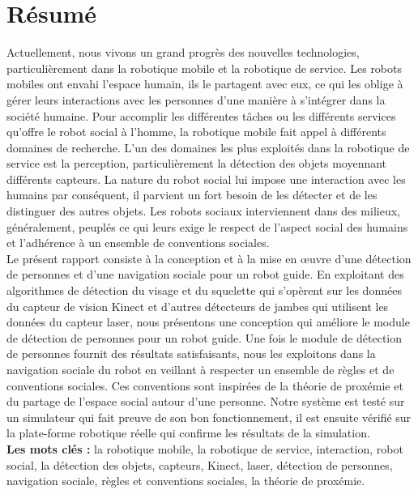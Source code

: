 \chapter*{Résumé}%
\label{Chapter2} %

\tab Actuellement, nous vivons un grand progrès des nouvelles technologies, particulièrement dans la robotique mobile et la robotique de service. Les robots mobiles ont envahi l'espace humain, ils le partagent avec eux, ce qui les oblige à gérer leurs interactions avec les personnes d'une manière à s'intégrer dans la société humaine. Pour accomplir les différentes tâches ou les différents services qu'offre le robot social à l'homme, la robotique mobile fait appel à différents domaines de recherche. L'un des domaines les plus exploités dans la robotique de service est la perception, particulièrement la détection des objets moyennant différents capteurs. La nature du robot social lui impose une interaction avec les humains par conséquent, il parvient un fort besoin de les détecter et de les distinguer des autres objets. Les robots sociaux interviennent dans des milieux, généralement, peuplés ce qui leurs exige le respect de l'aspect social des humains et l'adhérence à un ensemble de conventions sociales.\vspace{5px}\\
\tab Le présent rapport consiste à la conception et à la mise en œuvre d'une détection de personnes et d'une navigation sociale pour un robot guide. En exploitant des algorithmes de détection du visage et du squelette qui s'opèrent sur les données du capteur de vision Kinect et d'autres détecteurs de jambes qui utilisent les données du capteur laser, nous présentons une conception qui améliore le module de détection de personnes pour un robot guide. Une fois le module de détection de personnes fournit des résultats satisfaisants, nous les exploitons dans la navigation sociale du robot en veillant à respecter un ensemble de règles et de conventions sociales. Ces conventions sont inspirées de la théorie de proxémie et du partage de l'espace social autour d'une personne. Notre système est testé sur un simulateur qui fait preuve de son bon fonctionnement, il est ensuite vérifié sur la plate-forme robotique réelle qui confirme les résultats de la simulation.\vspace{5px}\\
\tab \textbf{Les mots clés : } la robotique mobile, la robotique de service, interaction, robot social, la détection des objets, capteurs, Kinect, laser, détection de personnes, navigation sociale, règles et conventions sociales, la théorie de proxémie.


